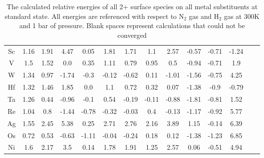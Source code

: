 \documentclass{article}
\begin{document}
\begin{table}
\begin{center}
\begin{tabular}{| c | c | c | c | c | c | c | c | c | c | c | c | c | c |}
Sc & 1.16 & 1.91 & 4.47 & 0.05 & 1.81 & 1.71 & 1.1 & 2.57 & -0.57 & -0.71 & -1.24 \\
V & 1.5 & 1.52 & 0.0 & 0.35 & 1.11 & 0.79 & 0.95 & 0.5 & -0.94 & -0.71 & 1.9 \\
W & 1.34 & 0.97 & -1.74 & -0.3 & -0.12 & -0.62 & 0.11 & -1.01 & -1.56 & -0.75 & 4.25 \\
Hf & 1.32 & 1.46 & 1.85 & 0.0 & 1.1 & 0.72 & 0.32 & 0.07 & -1.38 & -0.9 & -0.79 \\
Ta & 1.26 & 0.44 & -0.96 & -0.1 & 0.54 & -0.19 & -0.11 & -0.88 & -1.81 & -0.81 & 1.52 \\
Re & 1.04 & 0.8 & -1.44 & -0.78 & -0.32 & -0.03 & 0.4 & -0.13 & -1.17 & -0.92 & 5.77 \\
Ag & 1.55 & 2.45 & 5.38 & 0.25 & 2.71 & 2.76 & 2.16 & 3.89 & 1.15 & -0.14 & 6.39 \\
Os & 0.72 & 0.53 & -0.63 & -1.11 & -0.04 & -0.24 & 0.18 & 0.12 & -1.38 & -1.23 & 6.85 \\
Ni & 1.6 & 2.17 & 3.5 & 0.14 & 1.78 & 1.91 & 1.25 & 2.57 & 0.06 & -0.51 & 4.94 \\
\hline
\end{tabular}
\end{center}
\caption{The calculated relative energies of all 2+ surface species on all metal substituents at standard state. All energies are referenced with respect to N$_2$ gas and H$_2$ gas at 300K and 1 bar of pressure. Blank spaces represent calculations that could not be converged}
\label{table:energies}
\end{table}
\end{document}
